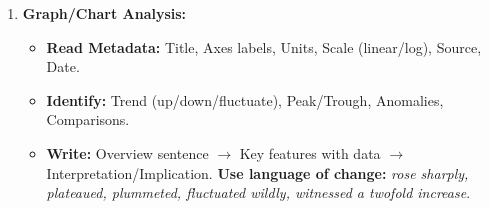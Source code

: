 \documentclass[11pt]{article}
\begin{document}
\begin{methode}
\begin{enumerate}
\begin{itemize}
    \end{itemize}
    \item \textbf{Graph/Chart Analysis:}
    \begin{itemize}
        \item \textbf{Read Metadata:} Title, Axes labels, Units, Scale (linear/log), Source, Date.
        \item \textbf{Identify:} Trend (up/down/fluctuate), Peak/Trough, Anomalies, Comparisons.
        \item \textbf{Write:} Overview sentence $\rightarrow$ Key features with data $\rightarrow$ Interpretation/Implication. \textbf{Use language of change:} \textit{rose sharply, plateaued, plummeted, fluctuated wildly, witnessed a twofold increase}.
    \end{itemize}
\end{enumerate}
\end{methode}
\end{document}
